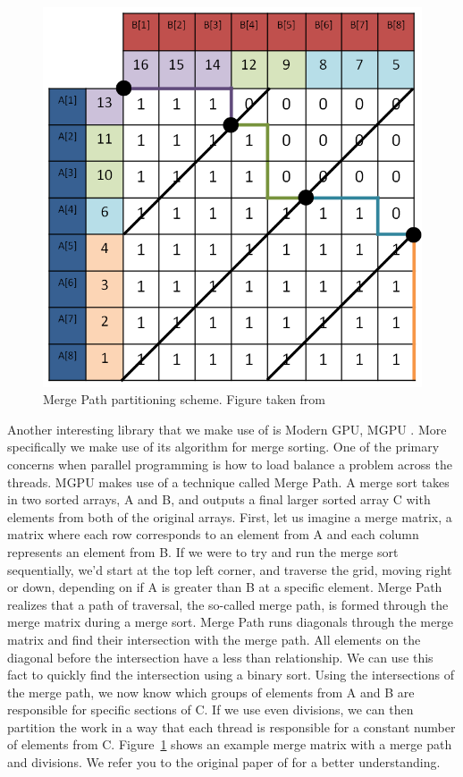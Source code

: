 \begin{figure}[ht!]
\centering
\includegraphics[width=1.0\textwidth]{images/MergePath.png}
\caption{Merge Path partitioning scheme. Figure taken from \cite{odeh2012merge}}
\label{fig:mgpu}
\end{figure}

Another interesting library that we make use of is Modern GPU, MGPU \cite{MGPU}.
More specifically we make use of its algorithm for merge sorting.
One of the primary concerns when parallel programming is how to load balance a problem across the threads.
MGPU makes use of a technique called Merge Path.
A merge sort takes in two sorted arrays, A and B, and outputs a final larger sorted array C with elements from both of the original arrays.
First, let us imagine a merge matrix, a matrix where each row corresponds to an element from A and each column represents an element from B.
If we were to try and run the merge sort sequentially, we'd start at the top left corner, and traverse the grid, moving right or down, depending on if A is greater than B at a specific element.
Merge Path realizes that a path of traversal, the so-called merge path, is formed through the merge matrix during a merge sort.
Merge Path runs diagonals through the merge matrix and find their intersection with the merge path.
All elements on the diagonal before the intersection have a less than relationship.
We can use this fact to quickly find the intersection using a binary sort.
Using the intersections of the merge path, we now know which groups of elements from A and B are responsible for specific sections of C.
If we use even divisions, we can then partition the work in a way that each thread is responsible for a constant number of elements from C.
Figure~\ref{fig:mgpu} shows an example merge matrix with a merge path and divisions.
We refer you to the original paper of \cite{odeh2012merge} for a better understanding.

